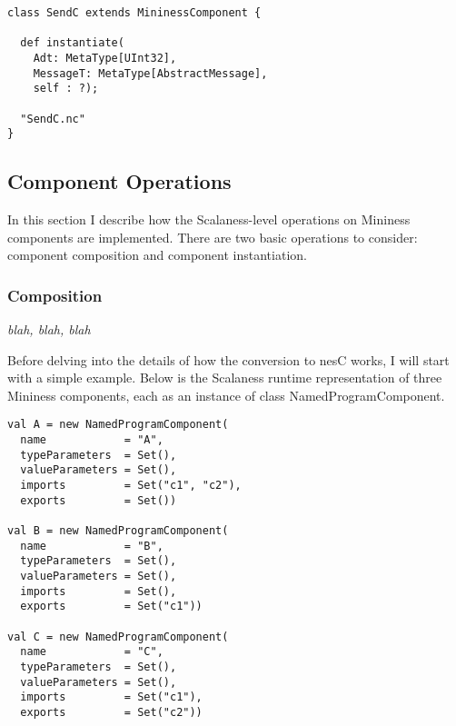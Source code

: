 \singlespace
\begin{lstlisting}[language=scalaness]
class SendC extends MininessComponent {

  def instantiate(
    Adt: MetaType[UInt32],
    MessageT: MetaType[AbstractMessage],
    self : ?);

  "SendC.nc"
}
\end{lstlisting}
\primaryspacing



\subsection{Component Operations}
\label{section-component-operations}


In this section I describe how the Scalaness-level operations on Mininess components are
implemented. There are two basic operations to consider: component composition and component
instantiation.

\subsubsection{Composition}
\label{section-composition}

\textit{blah, blah, blah}

Before delving into the details of how the conversion to nesC works, I will start with a simple
example. Below is the Scalaness runtime representation of three Mininess components, each as an
instance of class NamedProgramComponent.

\singlespace
\begin{lstlisting}[language=scalaness]
val A = new NamedProgramComponent(
  name            = "A",
  typeParameters  = Set(),
  valueParameters = Set(),
  imports         = Set("c1", "c2"),
  exports         = Set())

val B = new NamedProgramComponent(
  name            = "B",
  typeParameters  = Set(),
  valueParameters = Set(),
  imports         = Set(),
  exports         = Set("c1"))

val C = new NamedProgramComponent(
  name            = "C",
  typeParameters  = Set(),
  valueParameters = Set(),
  imports         = Set("c1"),
  exports         = Set("c2"))
\end{lstlisting}
\primaryspacing


